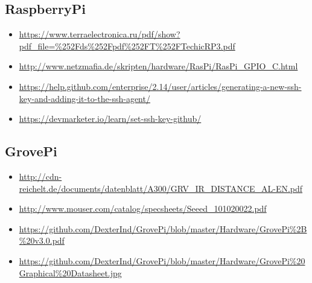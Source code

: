\documentclass{report}
\begin{document}
\subsection{RaspberryPi}

\begin{itemize}

\item \url{https://www.terraelectronica.ru/pdf/show?pdf_file=%252Fds%252Fpdf%252FT%252FTechicRP3.pdf}

\item \url{http://www.netzmafia.de/skripten/hardware/RasPi/RasPi_GPIO_C.html}

\item \url{https://help.github.com/enterprise/2.14/user/articles/generating-a-new-ssh-key-and-adding-it-to-the-ssh-agent/}

\item \url{https://devmarketer.io/learn/set-ssh-key-github/}

\end{itemize}

\subsection{GrovePi}

\begin{itemize}

\item \url{http://cdn-reichelt.de/documents/datenblatt/A300/GRV_IR_DISTANCE_AL-EN.pdf}

\item \url{http://www.mouser.com/catalog/specsheets/Seeed_101020022.pdf}

\item \url{https://github.com/DexterInd/GrovePi/blob/master/Hardware/GrovePi%2B%20v3.0.pdf}

\item \url{https://github.com/DexterInd/GrovePi/blob/master/Hardware/GrovePi%20Graphical%20Datasheet.jpg}

\end{itemize}
\end{document}
